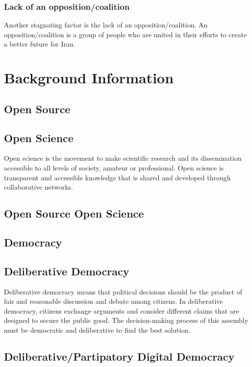 \documentclass{IEEEtran}
\begin{document}
\subsubsection{Lack of an opposition/coalition}
Another stagnating factor is the lack of an opposition/coalition. An opposition/coalition is a group of people who are united in their efforts to create a better future for Iran.

\section{Background Information}


\subsection{Open Source}


\subsection{Open Science}
Open science is the movement to make scientific research and its dissemination accessible to all levels of society, amateur or professional. Open science is transparent and accessible knowledge that is shared and developed through collaborative networks.


\subsection{Open Source Open Science}


\subsection{Democracy}


\subsection{Deliberative Democracy}
Deliberative democracy means that political decisions should be the product of fair and reasonable discussion and debate among citizens. In deliberative democracy, citizens exchange arguments and consider different claims that are designed to secure the public good. The decision-making process of this assembly must be democratic and deliberative to find the best solution. 
\subsection{Deliberative/Partipatory Digital Democracy}
\end{document}
